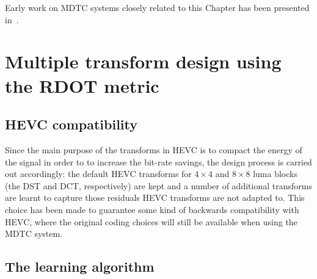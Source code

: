 \documentclass[11pt,a4paper,openright,twoside]{book}
\numberwithin{equation}{section} %
\numberwithin{figure}{section} %
\numberwithin{table}{section} %
\begin{document}
Early work on \ac{MDTC} systems closely related to this Chapter has been
presented in~\cite{arrufat-15-mdtc}.

\section{Multiple transform design using the \acs{RDOT} metric}
\label{sec:multiple_transform_design}

\subsection{\acs{HEVC} compatibility}
\label{sub:mdtc_hevc_compatibility}

Since the main purpose of the transforms in \ac{HEVC} is to compact the energy
of the signal in order to to increase the bit-rate savings, the design process
is carried out accordingly:
the default \ac{HEVC} transforms for $4\times4$ and $8\times8$ luma blocks
(the \ac{DST} and \ac{DCT}, respectively) are kept and a number of additional
transforms are learnt to capture those residuals \ac{HEVC} transforms are not
adapted to.
This choice has been made to guarantee some kind of backwards compatibility
with \ac{HEVC}, where the original coding choices will still be available when
using the \ac{MDTC} system.

\subsection{The learning algorithm}
\label{sub:mdtc_learning_algorithm}
\end{document}
